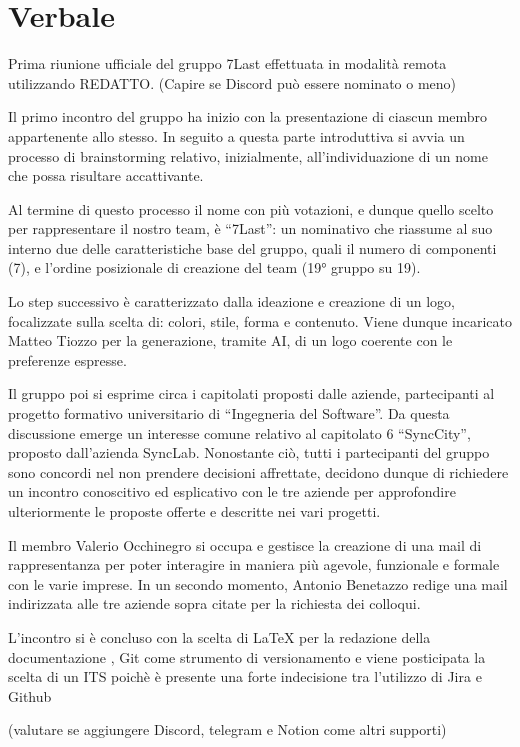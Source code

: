 \documentclass[italian,12pt]{article} %
\begin{document}
\newpage

\section{Verbale}
\begin{flushleft}

Prima riunione ufficiale del gruppo 7Last effettuata in modalità remota utilizzando REDATTO. 
(Capire se Discord può essere nominato o meno)

Il primo incontro del gruppo ha  inizio con la presentazione di ciascun membro appartenente allo stesso. 
In seguito a questa parte introduttiva si avvia un processo di brainstorming relativo, inizialmente, all’individuazione di un nome che 
possa risultare accattivante. 
	
Al termine di questo processo il nome con più votazioni, e dunque quello scelto per rappresentare il nostro team, è “7Last”: un nominativo 
che riassume al suo interno due delle caratteristiche base del gruppo, quali il numero di componenti (7), e l’ordine posizionale di creazione del team (19° gruppo su 19).
	
Lo step successivo è caratterizzato dalla ideazione e creazione di un logo, focalizzate sulla scelta di: colori, stile, forma e contenuto. 
Viene dunque incaricato Matteo Tiozzo per la generazione, tramite AI, di un logo coerente con le preferenze espresse.
	
Il gruppo poi si esprime circa i capitolati proposti dalle aziende, partecipanti al progetto formativo universitario di 
“Ingegneria del Software”. Da questa discussione emerge un interesse comune relativo al capitolato 6 “SyncCity”, proposto dall’azienda 
SyncLab. Nonostante ciò, tutti i partecipanti del gruppo sono concordi nel non prendere decisioni affrettate, decidono dunque di richiedere 
un incontro conoscitivo ed esplicativo con le tre aziende per approfondire ulteriormente le proposte offerte e descritte nei vari progetti.
	
Il membro Valerio Occhinegro si occupa e gestisce la creazione di una mail di rappresentanza per poter interagire in maniera più agevole, 
funzionale e formale con le varie imprese. In un secondo momento, Antonio Benetazzo redige una mail indirizzata alle tre aziende sopra 
citate per la richiesta dei colloqui.
	
L’incontro si è concluso con la scelta di LaTeX per la redazione  della documentazione , Git come strumento di versionamento  e viene 
posticipata la scelta di un ITS poichè è presente una forte indecisione tra l’utilizzo di Jira e Github
	
(valutare se aggiungere Discord, telegram e Notion come altri supporti)

\end{flushleft}
\end{document}
